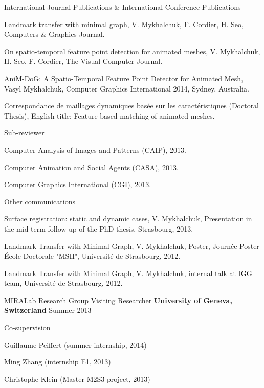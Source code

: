 
\begin{cventries}
  \cventry
    {\vspace{-20pt}} %
    {International Journal Publications \& International Conference Publications} %
    { } %
    { } %
    {
      \begin{cvitems} %
        \item {Landmark transfer with minimal graph, V. Mykhalchuk, F. Cordier, H. Seo, Computers \& Graphics Journal.}
        \item {On spatio-temporal feature point detection for animated meshes, V. Mykhalchuk, H. Seo, F. Cordier, The Visual Computer Journal.}
        \item {AniM-DoG: A Spatio-Temporal Feature Point Detector for Animated Mesh, Vasyl Mykhalchuk, Computer Graphics International 2014, Sydney, Australia.}
        \item {Correspondance de maillages dynamiques basée sur les caractéristiques (Doctoral Thesis), English title: Feature-based matching of animated meshes.}
      \end{cvitems}
    }
   
   \cventry
   {}
   {Sub-reviewer}
   {}
   {}
   {
     \begin{cvitems}
     \item{Computer Analysis of Images and Patterns (CAIP), 2013.}
     \item{Computer Animation and Social Agents (CASA), 2013.}
	 \item{Computer Graphics International (CGI), 2013.}
     \end{cvitems}
   } %
   
   \cventry
   {}
   {Other communications}
   {}
   {}
   {
     \begin{cvitems}
     \item Surface registration: static and dynamic cases, V. Mykhalchuk, Presentation in the mid-term  follow-up of the PhD thesis, Strasbourg, 2013. 
\item Landmark Transfer with Minimal Graph, V. Mykhalchuk, Poster, Journée Poster École Doctorale  "MSII", Université de Strasbourg, 2012. 
\item Landmark Transfer with Minimal Graph, V. Mykhalchuk, internal talk at IGG team, Université  de Strasbourg, 2012. 
     \end{cvitems}
   }
   
   \cventry
   {\href{http://www.miralab.ch/}{MIRALab Research Group}}
   {Visiting Researcher}
   {\textbf{University of Geneva, Switzerland}}
   {Summer 2013}
   { } %
   
   \cventry
   {}
   {Co-supervision}
   {}
   {}
   {
     \begin{cvitems}
     \item{Guillaume Peiffert (summer internship, 2014)}
     \item{Ming Zhang (internship E1, 2013)}
	 \item{Christophe Klein  (Master M2S3 project, 2013)}
     \end{cvitems}
   } %

\end{cventries}
